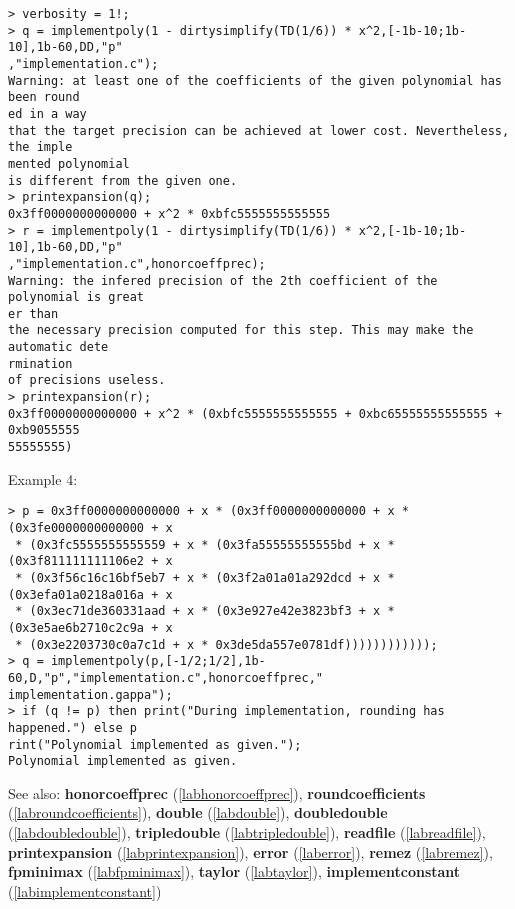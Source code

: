 \begin{center}\begin{minipage}{15cm}\begin{Verbatim}[frame=single]
> verbosity = 1!;
> q = implementpoly(1 - dirtysimplify(TD(1/6)) * x^2,[-1b-10;1b-10],1b-60,DD,"p"
,"implementation.c");
Warning: at least one of the coefficients of the given polynomial has been round
ed in a way
that the target precision can be achieved at lower cost. Nevertheless, the imple
mented polynomial
is different from the given one.
> printexpansion(q);
0x3ff0000000000000 + x^2 * 0xbfc5555555555555
> r = implementpoly(1 - dirtysimplify(TD(1/6)) * x^2,[-1b-10;1b-10],1b-60,DD,"p"
,"implementation.c",honorcoeffprec);
Warning: the infered precision of the 2th coefficient of the polynomial is great
er than
the necessary precision computed for this step. This may make the automatic dete
rmination
of precisions useless.
> printexpansion(r);
0x3ff0000000000000 + x^2 * (0xbfc5555555555555 + 0xbc65555555555555 + 0xb9055555
55555555)
\end{Verbatim}
\end{minipage}\end{center}
\noindent Example 4: 
\begin{center}\begin{minipage}{15cm}\begin{Verbatim}[frame=single]
> p = 0x3ff0000000000000 + x * (0x3ff0000000000000 + x * (0x3fe0000000000000 + x
 * (0x3fc5555555555559 + x * (0x3fa55555555555bd + x * (0x3f811111111106e2 + x
 * (0x3f56c16c16bf5eb7 + x * (0x3f2a01a01a292dcd + x * (0x3efa01a0218a016a + x
 * (0x3ec71de360331aad + x * (0x3e927e42e3823bf3 + x * (0x3e5ae6b2710c2c9a + x
 * (0x3e2203730c0a7c1d + x * 0x3de5da557e0781df))))))))))));
> q = implementpoly(p,[-1/2;1/2],1b-60,D,"p","implementation.c",honorcoeffprec,"
implementation.gappa");
> if (q != p) then print("During implementation, rounding has happened.") else p
rint("Polynomial implemented as given.");    
Polynomial implemented as given.
\end{Verbatim}
\end{minipage}\end{center}
See also: \textbf{honorcoeffprec} (\ref{labhonorcoeffprec}), \textbf{roundcoefficients} (\ref{labroundcoefficients}), \textbf{double} (\ref{labdouble}), \textbf{doubledouble} (\ref{labdoubledouble}), \textbf{tripledouble} (\ref{labtripledouble}), \textbf{readfile} (\ref{labreadfile}), \textbf{printexpansion} (\ref{labprintexpansion}), \textbf{error} (\ref{laberror}), \textbf{remez} (\ref{labremez}), \textbf{fpminimax} (\ref{labfpminimax}), \textbf{taylor} (\ref{labtaylor}), \textbf{implementconstant} (\ref{labimplementconstant})
